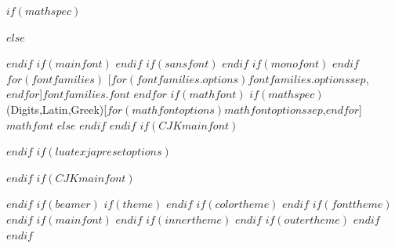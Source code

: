 \usepackage{setspace}

\usepackage{ifxetex,ifluatex}
\fi{} %
  \usepackage[T1]{fontenc}
  \usepackage[utf8]{inputenc}
  \usepackage{textcomp} %
\else %
$if(mathspec)$
  \ifxetex
    \usepackage{mathspec}
  \else
    \usepackage{unicode-math}
  \fi
$else$
  \usepackage{unicode-math}
$endif$
$if(mainfont)$
$endif$
$if(sansfont)$
$endif$
$if(monofont)$
$endif$
$for(fontfamilies)$
  [$for(fontfamilies.options)$$fontfamilies.options$$sep$,$endfor$]{$fontfamilies.font$}
$endfor$
$if(mathfont)$
$if(mathspec)$
  \ifxetex
    \setmathfont(Digits,Latin,Greek)[$for(mathfontoptions)$$mathfontoptions$$sep$,$endfor$]{$mathfont$}
  \else
  \fi
$else$
$endif$
$endif$
$if(CJKmainfont)$
  \ifxetex
    \usepackage{xeCJK}
  \fi
$endif$
$if(luatexjapresetoptions)$
  \ifluatex
    \usepackage[$for(luatexjapresetoptions)$$luatexjapresetoptions$$sep$,$endfor$]{luatexja-preset}
  \fi
$endif$
$if(CJKmainfont)$
  \ifluatex
    \usepackage[$for(luatexjafontspecoptions)$$luatexjafontspecoptions$$sep$,$endfor$]{luatexja-fontspec}
  \fi
$endif$
\fi
$if(beamer)$
$if(theme)$
$endif$
$if(colortheme)$
$endif$
$if(fonttheme)$
$endif$
$if(mainfont)$
$endif$
$if(innertheme)$
$endif$
$if(outertheme)$
$endif$
$endif$



